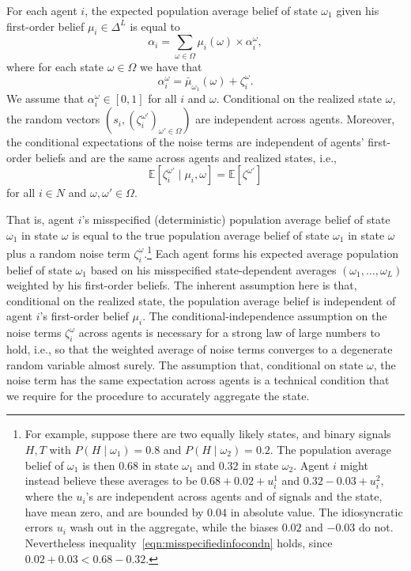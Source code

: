 \documentclass[12pt,reqno]{amsart}
\begin{document}
\begin{assumption}\label{ass:misspecified}
For each agent $i$, the expected population average belief of state $\omega_1$ given his first-order belief $\mu_i\in\Delta^L$ is equal to
\begin{equation*} \alpha_i=\sum_{\omega\in\Omega}\mu_i(\omega)\times\alpha_i^\omega,
\end{equation*}
where for each state $\omega\in\Omega$ we have that
\begin{equation}\label{eq1:2ndordermisspec}
    \alpha_i^\omega=\bar\mu_{\omega_1}(\omega)+\zeta_i^\omega.
\end{equation}
We assume that $\alpha_i^\omega\in[0,1]$ for all $i$ and $\omega$. Conditional on the realized state $\omega$, the random vectors $(s_i,(\zeta_i^{\omega'})_{\omega'\in\Omega})$ are independent across agents. Moreover, the conditional expectations of the noise terms are independent of agents' first-order beliefs and are the same across agents and realized states, i.e.,
\begin{equation*}
    \mathbb E[\zeta_i^{\omega'}\mid\mu_i,\omega]
    =\mathbb E[\zeta^{\omega'}]
\end{equation*}
for all $i\in N$ and $\omega,\omega'\in\Omega.$
\end{assumption}

That is, agent $i$'s misspecified (deterministic) population average belief of state $\omega_1$ in state $\omega$ is equal to the true population average belief of state $\omega_1$ in state $\omega$ plus a random noise term $\zeta _{i}^{\omega }$.\footnote{ For example, suppose there are two equally likely states, and binary signals $H,T$ with $P(H\mid\omega_1)=0.8$ and $P(H\mid\omega_2)=0.2$. The population average belief of $\omega_1$ is then $0.68$ in state $\omega_1$ and $0.32$ in state $\omega_2$. Agent $i$ might instead believe these averages to be $0.68+0.02+u_i^{1}$ and $0.32-0.03+u_i^{2}$, where the $u_i$'s are independent across agents and of signals and the state, have mean zero, and are bounded by $0.04$ in absolute value. The idiosyncratic errors $u_i$ wash out in the aggregate, while the biases $0.02$ and $-0.03$ do not. Nevertheless inequality~\eqref{eqn:misspecifiedinfocondn} holds, since $0.02+0.03<0.68-0.32$.} Each agent forms his expected average population belief of state $\omega_1$ based on his misspecified state-dependent averages $(\omega_1,\ldots,\omega_L)$ weighted by his first-order beliefs. The inherent assumption here is that, conditional on the realized state, the population average belief is independent of agent $i$'s first-order belief $\mu_i$. The conditional-independence assumption on the noise terms $\zeta_i^\omega$ across agents is necessary for a strong law of large numbers to hold, i.e., so that the weighted average of noise terms converges to a degenerate random variable almost surely. The assumption that, conditional on state $\omega$, the noise term has the same expectation across agents is a technical condition that we require for the procedure to accurately aggregate the state.
\end{document}
